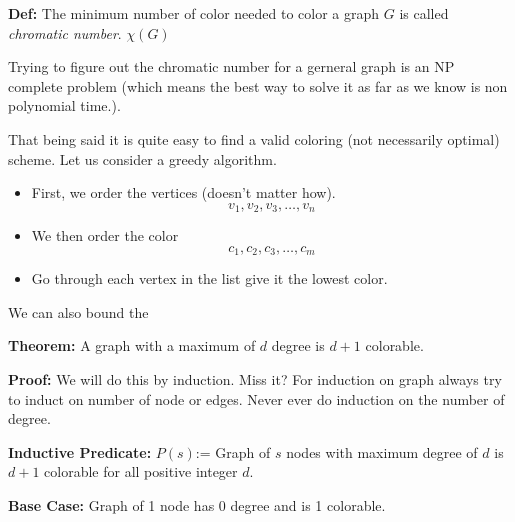 \documentclass[a4paper, 12pt]{article}
\newcommand{\definition}{\vspace{1em}\noindent\textbf{Def:} }
\newcommand{\theorem}{\vspace{1em}\noindent\textbf{Theorem:} }
\newcommand{\predicate}{\vspace{0.25em}\noindent\textbf{Inductive Predicate:} }
\renewcommand{\proof}{\vspace{0.5em}\noindent\textbf{Proof:} }
\newcommand{\basecase}{\vspace{0.25em}\noindent\textbf{Base Case:} }
\begin{document}
	\definition The minimum number of color needed to color a graph $G$ is called \emph{chromatic number}. $\chi(G)$
	
	Trying to figure out the chromatic number for a gerneral graph is an NP complete problem (which means the best way to solve it as far as we know is non polynomial time.).
	
	That being said it is quite easy to find a valid coloring (not necessarily optimal) scheme. Let us consider a greedy algorithm.
	
	\begin{itemize}
		\item First, we order the vertices (doesn't matter how).\[
			v_1, v_2, v_3 , \ldots, v_n
		\]
		\item We then order the color
		\[
			c_1, c_2, c_3, \ldots, c_m
		\]
		\item Go through each vertex in the list give it the lowest color.
	\end{itemize}
	
	
	We can also bound the 
	
	\theorem A graph with a maximum of $d$ degree is $d+1$ colorable.
	
	\proof We will do this by induction. Miss it? For induction on graph always try to induct on number of node or edges. Never ever do induction on the number of degree.
	
	\predicate $P(s)$:= Graph of $s$ nodes with maximum degree of $d$ is $d+1$ colorable for all positive integer $d$.
	
	\basecase Graph of 1 node has 0 degree and is 1 colorable.
	
\end{document}
